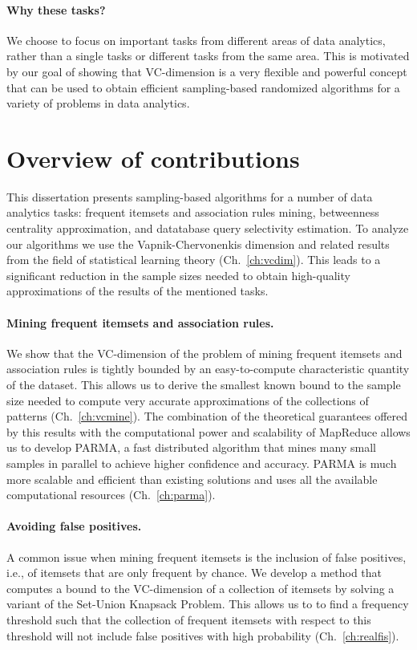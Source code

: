 \paragraph*{Why these tasks?} We choose to focus on important tasks from
different areas of data analytics, rather than a single tasks or different tasks
from the same area. This is motivated by our goal of showing that VC-dimension
is a very flexible and powerful concept that can be used to obtain efficient
sampling-based randomized algorithms for a variety of problems in data
analytics.

\section{Overview of contributions}
This dissertation presents sampling-based algorithms for a number of data
analytics tasks: frequent itemsets and association rules mining, betweenness
centrality approximation, and datatabase query selectivity estimation. To
analyze our algorithms we use the Vapnik-Chervonenkis dimension and related
results from the field of statistical learning theory (Ch.~\ref{ch:vcdim}). This
leads to a significant reduction in the sample sizes needed to obtain
high-quality approximations of the results of the mentioned tasks.

\paragraph*{Mining frequent itemsets and association rules.} We show that the
VC-dimension of the problem of mining frequent itemsets and association rules is
tightly bounded by an easy-to-compute characteristic quantity of the dataset.
This allows us to derive the smallest known bound to the sample size needed to
compute very accurate approximations of the collections of patterns
(Ch.~\ref{ch:vcmine}). The combination of the theoretical guarantees offered by
this results with the computational power and scalability of MapReduce allows us
to develop PARMA, a fast distributed algorithm that mines many small samples in
parallel to achieve higher confidence and accuracy. PARMA
is much more scalable and efficient than existing solutions and uses all the
available computational resources (Ch.~\ref{ch:parma}). 

\paragraph*{Avoiding false positives.} A common issue when mining frequent
itemsets is the inclusion of false positives, i.e., of itemsets that are only
frequent by chance. We develop a method that computes a bound to the VC-dimension
of a collection of itemsets by solving a variant of the Set-Union Knapsack
Problem. This allows us to to find a frequency threshold such that the
collection of frequent itemsets with respect to this threshold will not include
false positives with high probability (Ch.~\ref{ch:realfis}).

